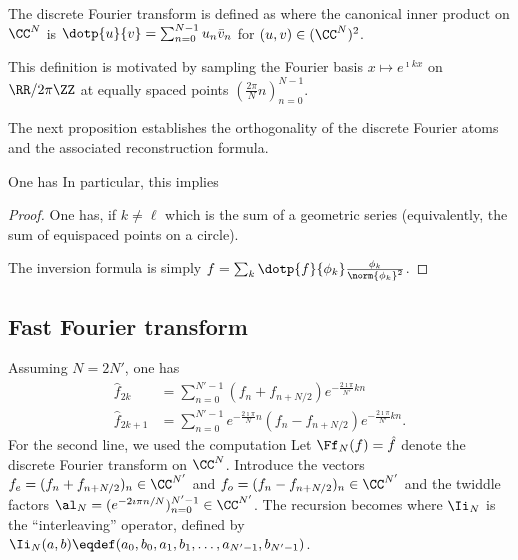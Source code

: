 The discrete Fourier transform is defined as
where the canonical inner product on $\CC^N$ is $\dotp{u}{v}=\sum_{n=0}^{N-1}u_n\bar v_n$ for $(u,v) \in (\CC^N)^2$.
 
This definition is motivated by sampling the Fourier basis $x \mapsto e^{\imath k x}$ on $\RR/2\pi\ZZ$ at equally spaced points $( \frac{2\pi}{N}n )_{n=0}^{N-1}$.
 
The next proposition establishes the orthogonality of the discrete Fourier atoms and the associated reconstruction formula.

\begin{prop}
	One has
	In particular, this implies
\end{prop}
\begin{proof}
	One has, if $k \neq \ell$
	which is the sum of a geometric series (equivalently, the sum of equispaced points on a circle). 
	 
	The inversion formula is simply $f = \sum_k \dotp{f}{\phi_k} \frac{\phi_k}{\norm{\phi_k}^2}$.
\end{proof}


                                                
\subsection{Fast Fourier transform}

Assuming $N=2N'$, one has 
\begin{align*}
	\hat f_{2k} &= \sum_{n=0}^{N'-1} (f_n + f_{n+N/2}) e^{ -\frac{2\imath\pi}{N'} k n } \\
	\hat f_{2k+1} &= \sum_{n=0}^{N'-1} e^{ -\frac{2\imath\pi}{N} n } (f_n - f_{n+N/2}) e^{ -\frac{2\imath\pi}{N'} k n }.
\end{align*}
For the second line, we used the computation
Let $\Ff_N(f)=\hat f$ denote the discrete Fourier transform on $\CC^N$. Introduce
the vectors $f_e = (f_n + f_{n+N/2})_n \in \CC^{N'}$ and $f_o = (f_n - f_{n+N/2})_n \in \CC^{N'}$
and the twiddle factors $\al_N=(e^{-2\imath\pi n/N})_{n=0}^{N'-1}\in\CC^{N'}$. The recursion becomes
where $\Ii_N$ is the ``interleaving'' operator, defined by $\Ii_N(a,b) \eqdef (a_0,b_0,a_1,b_1,\ldots,a_{N'-1},b_{N'-1})$.
 
